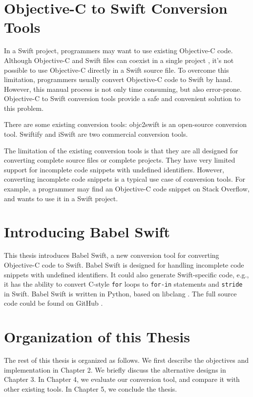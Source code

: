 \documentclass{sfuthesis}
\begin{document}
\section{Objective-C to Swift Conversion Tools}

In a Swift project, programmers may want to use existing Objective-C code. Although Objective-C and Swift files can coexist in a single project \cite{swiftandobjc}, it's not possible to use Objective-C directly in a Swift source file. To overcome this limitation, programmers usually convert Objective-C code to Swift by hand. However, this manual process is not only time consuming, but also error-prone. Objective-C to Swift conversion tools provide a safe and convenient solution to this problem. 

There are some existing conversion tools: objc2swift \cite{objc2swift} is an open-source conversion tool. Swiftify \cite{swiftify} and iSwift \cite{iswift} are two commercial conversion tools.

The limitation of the existing conversion tools is that they are all designed for converting complete source files or complete projects. They have very limited support for incomplete code snippets with undefined identifiers. However, converting incomplete code snippets is a typical use case of conversion tools. For example, a programmer may find an Objective-C code snippet on Stack Overflow, and wants to use it in a Swift project.

\section{Introducing Babel Swift}

This thesis introduces Babel Swift, a new conversion tool for converting Objective-C code to Swift. Babel Swift is designed for handling incomplete code snippets with undefined identifiers. It could also generate Swift-specific code, e.g., it has the ability to convert C-style \texttt{for} loops to \texttt{for-in} statements and \texttt{stride} in Swift. Babel Swift is written in Python, based on libclang \cite{libclang}. The full source code could be found on GitHub \cite{babelswift}.

\section{Organization of this Thesis}

The rest of this thesis is organized as follows. We first describe the objectives and implementation in Chapter 2. We briefly discuss the alternative designs in Chapter 3. In Chapter 4, we evaluate our conversion tool, and compare it with other existing tools. In Chapter 5, we conclude the thesis.
\end{document}
